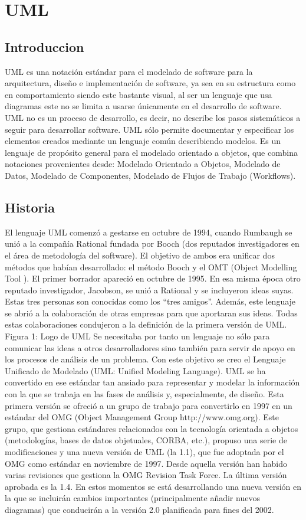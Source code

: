 \chapter{UML\cite{UML_2,Iak,Ira,Rai}}
\section{Introduccion}
UML es una notación estándar para el modelado de software para la arquitectura, diseño e implementación de software, ya sea en su estructura como en comportamiento siendo este bastante visual, al ser un lenguaje que usa diagramas este no se limita a usarse únicamente en el desarrollo de software.
UML no es un proceso de desarrollo, es decir, no describe los pasos sistemáticos a  seguir para desarrollar software. UML sólo permite documentar y especificar los elementos creados mediante un lenguaje común describiendo modelos. Es un lenguaje de propósito general para el modelado orientado a objetos, que combina notaciones provenientes desde: Modelado Orientado a Objetos, Modelado de Datos, Modelado de Componentes, Modelado de Flujos de Trabajo (Workflows).
\newpage
\newpage
\section{Historia}
El lenguaje UML comenzó a gestarse en octubre de 1994, cuando Rumbaugh se unió a la compañía Rational fundada por Booch (dos reputados investigadores en el área de metodología del software). El objetivo de ambos era unificar dos métodos que habían desarrollado: el método Booch y el OMT (Object Modelling Tool ). El primer borrador apareció en octubre de 1995. En esa misma época otro reputado investigador, Jacobson, se unió a Rational y se incluyeron ideas suyas. Estas tres personas son conocidas como los “tres amigos”. Además, este lenguaje se abrió a la colaboración de otras empresas para que aportaran sus ideas. Todas estas colaboraciones condujeron a la definición de la primera versión de UML. Figura 1: Logo de UML Se necesitaba por tanto un lenguaje no sólo para comunicar las ideas a otros desarrolladores sino también para servir de apoyo en los procesos de análisis de un problema. Con este objetivo se creo el Lenguaje Unificado de Modelado (UML: Unified Modeling Language). UML se ha convertido en ese estándar tan ansiado para representar y modelar la información con la que se trabaja en las fases de análisis y, especialmente, de diseño. 
Esta primera versión se ofreció a un grupo de trabajo para convertirlo en 1997 en un estándar del OMG (Object Management Group http://www.omg.org). Este grupo, que gestiona estándares relacionados con la tecnología orientada a objetos (metodologías, bases de datos objetuales, CORBA, etc.), propuso una serie de modificaciones y una nueva versión de UML (la 1.1), que fue adoptada por el OMG como estándar en noviembre de 1997. Desde aquella versión han habido varias revisiones que gestiona la OMG Revision Task Force. La última versión aprobada es la 1.4. En estos momentos se está desarrollando una nueva versión en la que se incluirán cambios importantes (principalmente añadir nuevos diagramas) que conducirán a la versión 2.0 planificada para fines del 2002.

